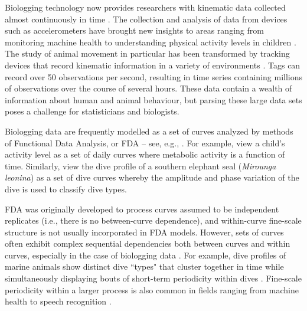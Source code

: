 
Biologging technology now provides researchers with kinematic data collected almost continuously in time \citep{Hooten:2017}.
The collection and analysis of data from devices such as accelerometers have brought new insights to areas ranging from monitoring machine health \citep{Getman:2009} to understanding physical activity levels in children \citep{Morris:2007}. The study of animal movement in particular has been transformed by tracking devices that record kinematic information in a variety of environments \citep{Borger:2020,Dot:2016b}. Tags can record over 50 observations per second, resulting in time series containing millions of observations over the course of several hours. These data contain a wealth of information about human and animal behaviour, but parsing these large data sets poses a challenge for statisticians and biologists.

Biologging data are frequently modelled as a set of curves analyzed by methods of Functional Data Analysis, or FDA -- see, e.g., \citet{Ramsay:2005}. For example, \citet{Morris:2007} view a child's activity level as a set of daily curves where metabolic activity is a function of time. Similarly, \citet{Fu:2017} view the dive profile of a southern elephant seal (\textit{Mirounga leonina}) as a set of dive curves whereby the amplitude and phase variation of the dive is used to classify dive types.
%

FDA was originally developed to process curves assumed to be independent replicates (i.e., there is no between-curve dependence), and within-curve fine-scale structure is not usually incorporated in FDA models. However, sets of curves often exhibit complex sequential dependencies both between curves and within curves, especially in the case of biologging data \citep{Barajas:2017}.
For example, dive profiles of marine animals show distinct dive ``types" that cluster together in time \citep{Tennessen:2019b} while simultaneously displaying bouts of short-term periodicity within dives \citep{Adam:2019}. Fine-scale periodicity within a larger process is also common in fields ranging from machine health \citep{Xin:2018,Lucero:2019} to speech recognition \citep{Juang:1991}.

